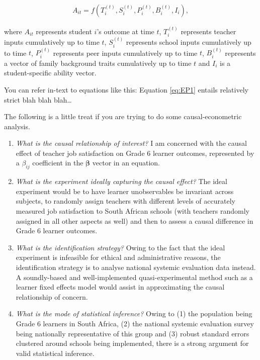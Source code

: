 \documentclass[12pt,preprint, authoryear]{article}
\numberwithin{equation}{section}
\numberwithin{figure}{section}
\numberwithin{table}{section}
\begin{document}
\begin{align} \label{eq:EP1}
A_{it}=f(T_i^{(t)},S_i^{(t)},P_i^{(t)},B_i^{(t)},I_i),
\end{align}

where \(A_{it}\) represents student \(i\)'s outcome at time \(t\),
\(T_i^{(t)}\) represents teacher inputs cumulatively up to time \(t\),
\(S_i^{(t)}\) represents school inputs cumulatively up to time \(t\),
\(P_i^{(t)}\) represents peer inputs cumulatively up to time \(t\),
\(B_i^{(t)}\) represents a vector of family background traits
cumulatively up to time \(t\) and \(I_i\) is a student-specific ability
vector.

You can refer in-text to equations like this: Equation \ref{eq:EP1}
entails relatively strict blah blah blah\ldots{}

The following is a little treat if you are trying to do some
causal-econometric analysis.

\begin{enumerate}
\def\labelenumi{\arabic{enumi}.}
\item
  \emph{What is the causal relationship of interest?} I am concerned
  with the causal effect of teacher job satisfaction on Grade 6 learner
  outcomes, represented by a \(\beta_{ij}\) coefficient in the
  \(\boldsymbol\beta\) vector in an equation.
\item
  \emph{What is the experiment ideally capturing the causal effect?} The
  ideal experiment would be to have learner unobservables be invariant
  across subjects, to randomly assign teachers with different levels of
  accurately measured job satisfaction to South African schools (with
  teachers randomly assigned in all other aspects as well) and then to
  assess a causal difference in Grade 6 learner outcomes.
\item
  \emph{What is the identification strategy?} Owing to the fact that the
  ideal experiment is infeasible for ethical and administrative reasons,
  the identification strategy is to analyse national systemic evaluation
  data instead. A soundly-based and well-implemented quasi-experimental
  method such as a learner fixed effects model would assist in
  approximating the causal relationship of concern.
\item
  \emph{What is the mode of statistical inference?} Owing to (1) the
  population being Grade 6 learners in South Africa, (2) the national
  systemic evaluation survey being nationally representative of this
  group and (3) robust standard errors clustered around schools being
  implemented, there is a strong argument for valid statistical
  inference.
\end{enumerate}
\end{document}
